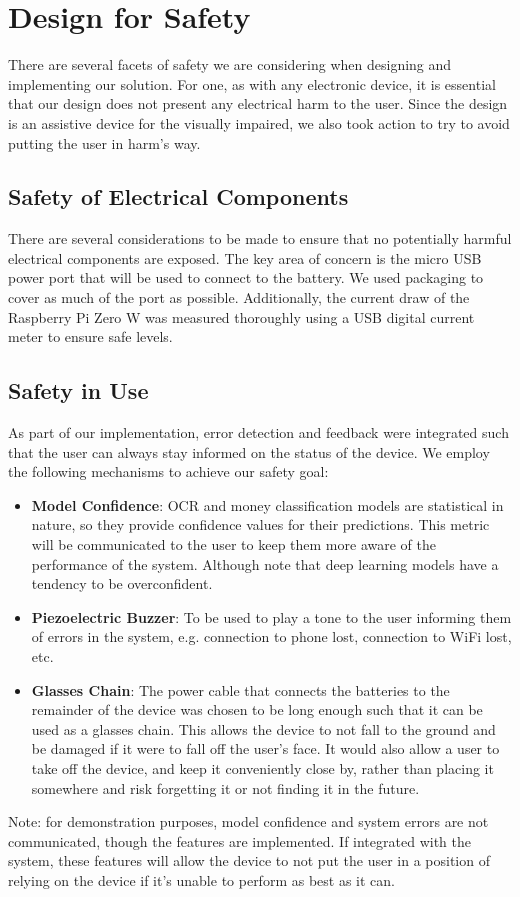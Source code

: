 \documentclass[a4paper,11pt]{article}
\begin{document}
\section{Design for Safety}
There are several facets of safety we are considering when designing and implementing our solution. For one, as with any electronic device, it is essential that our design does not present any electrical harm to the user. Since the design is an assistive device for the visually impaired, we also took action to try to avoid putting the user in harm's way.

\subsection{Safety of Electrical Components}
There are several considerations to be made to ensure that no potentially harmful electrical components are exposed. The key area of concern is the micro USB power port that will be used to connect to the battery. We used packaging to cover as much of the port as possible. Additionally, the current draw of the Raspberry Pi Zero W was measured thoroughly using a USB digital current meter to ensure safe levels.

\subsection{Safety in Use}
As part of our implementation, error detection and feedback were integrated such that the user can always stay informed on the status of the device. We employ the following mechanisms to achieve our safety goal:
\begin{itemize}
    \item \textbf{Model Confidence}: OCR and money classification models are statistical in nature, so they provide confidence values for their predictions. This metric will be communicated to the user to keep them more aware of the performance of the system. Although note that deep learning models have a tendency to be overconfident.
    \item \textbf{Piezoelectric Buzzer}: To be used to play a tone to the user informing them of errors in the system, e.g. connection to phone lost, connection to WiFi lost, etc.
    \item \textbf{Glasses Chain}: The power cable that connects the batteries to the remainder of the device was chosen to be long enough such that it can be used as a glasses chain. This allows the device to not fall to the ground and be damaged if it were to fall off the user's face. It would also allow a user to take off the device, and keep it conveniently close by, rather than placing it somewhere and risk forgetting it or not finding it in the future.
\end{itemize}
Note: for demonstration purposes, model confidence and system errors are not communicated, though the features are implemented. If integrated with the system, these features will allow the device to not put the user in a position of relying on the device if it's unable to perform as best as it can.
\end{document}
